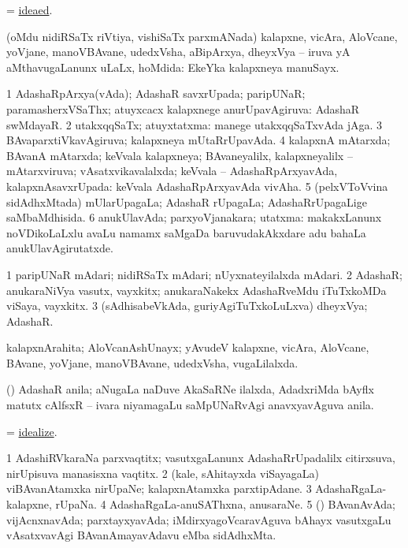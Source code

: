 \bentry
{}
\gl{\gu}
\bmng
 = \hyperlink{ideaed}{ideaed}. 
\emng
\eentry

\bentry
{}
\gl{\gu}
\bmng
(oMdu nidiRSaTx riVtiya, vishiSaTx parxmANada) kalapxne, vicAra, AloVcane, yoVjane, manoVBAvane, udedxVsha, aBipArxya, dheyxVya -- iruva yA aMthavugaLanunx uLaLx, hoMdida:  EkeYka kalapxneya manuSayx. 
\emng
\eentry

\bentry
{}
\gl{\gu}
\bmng
\bnum
\num{1} AdashaRpArxya(vAda); AdashaR savxrUpada; paripUNaR; paramasherxVSaThx; atuyxcacx kalapxnege anurUpavAgiruva:  AdashaR swMdayaR. 
\num{2} utakxqqSaTx; atuyxtatxma:  manege utakxqqSaTxvAda jAga. 
\num{3} BAvaparxtiVkavAgiruva; kalapxneya mUtaRrUpavAda. 
\num{4} kalapxnA mAtarxda; BAvanA mAtarxda; keVvala kalapxneya; BAvaneyalilx, kalapxneyalilx -- mAtarxviruva; vAsatxvikavalalxda; keVvala -- AdashaRpArxyavAda, kalapxnAsavxrUpada:  keVvala AdashaRpArxyavAda vivAha. 
\num{5} (pelxVToVvina sidAdhxMtada) mUlarUpagaLa; AdashaR rUpagaLa; AdashaRrUpagaLige saMbaMdhisida. 
\num{6} anukUlavAda; parxyoVjanakara; utatxma:  makakxLanunx noVDikoLaLxlu avaLu namamx saMgaDa baruvudakAkxdare adu bahaLa anukUlavAgirutatxde. 
\enum
\emng
\eentry

\bentry
{}
\gl{\nA}
\bmng
\bnum
\num{1} paripUNaR mAdari; nidiRSaTx mAdari; nUyxnateyilalxda mAdari. 
\num{2} AdashaR; anukaraNiVya vasutx, vayxkitx; anukaraNakekx AdashaRveMdu iTuTxkoMDa viSaya, vayxkitx. 
\num{3} (sAdhisabeVkAda, guriyAgiTuTxkoLuLxva) dheyxVya; AdashaR. 
\enum
\emng
\eentry

\bentry
{}
\gl{\gu}
\bmng
kalapxnArahita; AloVcanAshUnayx; yAvudeV kalapxne, vicAra, AloVcane, BAvane, yoVjane, manoVBAvane, udedxVsha, \mo vugaLilalxda. 
\emng
\eentry

\bentry
{}
\gl{\nA}
\bmng
(\Bwvi) AdashaR anila; aNugaLa naDuve AkaSaRNe ilalxda, AdadxriMda bAyflx matutx cAlfsxR -- ivara niyamagaLu saMpUNaRvAgi anavxyavAguva anila. 
\emng
\eentry

\bentry
{}
\gl{\sakirx}
\bmng
 = \hyperlink{idealize}{idealize}. 
\emng
\eentry

\bentry
{}
\gl{\nA}
\bmng
\bnum
\num{1} AdashiRVkaraNa parxvaqtitx; vasutxgaLanunx AdashaRrUpadalilx citirxsuva, nirUpisuva manasisxna vaqtitx. 
\num{2} (kale, sAhitayxda viSayagaLa) viBAvanAtamxka nirUpaNe; kalapxnAtamxka parxtipAdane. 
\num{3} AdashaRgaLa-kalapxne, rUpaNa. 
\num{4} AdashaRgaLa-anuSAThxna, anusaraNe. 
\num{5} (\tashA) BAvanAvAda; vijAcnxnavAda; parxtayxyavAda; iMdirxyagoVcaravAguva bAhayx vasutxgaLu vAsatxvavAgi BAvanAmayavAdavu eMba sidAdhxMta. 
\enum
\emng
\eentry

